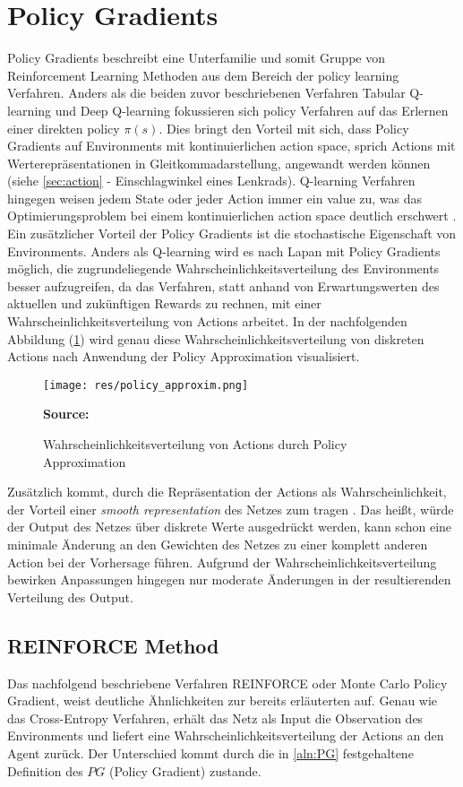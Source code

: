 \documentclass[11pt]{scrartcl}
\newcommand{\source}[1]{\vspace{-5pt} \caption*{\hfill \textbf{Source:} {#1}} }
\begin{document}
\newpage
\section{Policy Gradients}
Policy Gradients beschreibt eine Unterfamilie und somit Gruppe von Reinforcement Learning 
Methoden aus dem Bereich der policy learning Verfahren. Anders als die beiden zuvor
beschriebenen Verfahren Tabular Q-learning und Deep Q-learning fokussieren sich policy
Verfahren auf das Erlernen einer direkten policy $\pi(s)$. Dies bringt den Vorteil mit sich,
dass Policy Gradients auf Environments mit kontinuierlichen action space, sprich Actions mit
Werterepräsentationen in Gleitkommadarstellung, angewandt werden können (siehe
\ref{sec:action}  - Einschlagwinkel eines Lenkrads). Q-learning Verfahren
hingegen weisen jedem State oder jeder Action immer ein value zu, was das Optimierungsproblem
bei einem kontinuierlichen action space deutlich erschwert \cite[~S.242]{L2018}. Ein
zusätzlicher Vorteil der Policy Gradients ist die stochastische Eigenschaft von Environments.
Anders als Q-learning wird es nach Lapan\cite[~S.242]{L2018} mit Policy Gradients möglich,
die zugrundeliegende Wahrscheinlichkeitsverteilung des Environments besser aufzugreifen,
da das Verfahren, statt anhand von Erwartungswerten des aktuellen und zukünftigen Rewards zu
rechnen, mit einer Wahrscheinlichkeitsverteilung von Actions arbeitet. In der nachfolgenden
Abbildung (\ref{fig:prob-dist-pg}) wird genau diese Wahrscheinlichkeitsverteilung von
diskreten Actions nach Anwendung der Policy Approximation visualisiert.

\begin{figure}[htp]
\centering
\texttt{[image: res/policy\_approxim.png]}
\caption{Wahrscheinlichkeitsverteilung von Actions durch Policy Approximation}
\source{\cite[~S.243 - Chapter 9 - Figure 1]{L2018}}
\label{fig:prob-dist-pg}
\end{figure}

Zusätzlich kommt, durch die Repräsentation der Actions als Wahrscheinlichkeit, der Vorteil einer
\textit{smooth representation} des Netzes zum tragen \cite[~S.243]{L2018}. 
Das heißt, würde der Output des Netzes über diskrete Werte ausgedrückt werden, kann schon eine
minimale Änderung an den Gewichten des Netzes zu einer komplett anderen Action bei der
Vorhersage führen. Aufgrund der Wahrscheinlichkeitsverteilung bewirken Anpassungen hingegen
nur moderate Änderungen in der resultierenden Verteilung des Output.


\subsection{REINFORCE Method}
Das nachfolgend beschriebene Verfahren REINFORCE oder Monte Carlo Policy Gradient, weist
deutliche Ähnlichkeiten zur bereits erläuterten  auf.
Genau wie das Cross-Entropy Verfahren, erhält das Netz als Input die Observation des
Environments und liefert eine Wahrscheinlichkeitsverteilung der Actions an den Agent
zurück. Der Unterschied kommt durch die in \autoref{aln:PG} festgehaltene Definition
des $PG$ (Policy Gradient) zustande.
\end{document}
